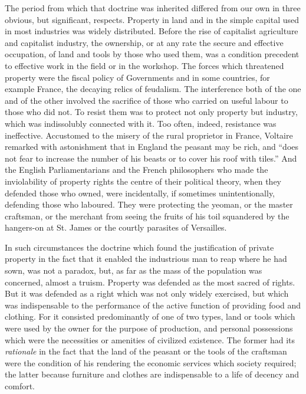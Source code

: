 \documentclass{book}
\begin{document}
The period from which that doctrine was inherited differed from our own in three obvious, but significant, respects. Property in land and in the simple capital used in most industries was widely distributed. Before the rise of capitalist agriculture and capitalist industry, the ownership, or at any rate the secure and effective occupation, of land and tools by those who used them, was a condition precedent to effective work in the field or in the workshop. The forces which threatened property were the fiscal policy of Governments and in some countries, for example France, the decaying relics of feudalism. The interference both of the one and of the other involved the sacrifice of those who carried on useful labour to those who did not. To resist them was to protect not only property but industry, which was indissolubly connected with it. Too often, indeed, resistance was ineffective. Accustomed to the misery of the rural proprietor in France, Voltaire remarked with astonishment that in England the peasant may be rich, and “does not fear to increase the number of his beasts or to cover his roof with tiles.” And the English Parliamentarians and the French philosophers who made the inviolability of property rights the centre of their political theory, when they defended those who owned, were incidentally, if sometimes unintentionally, defending those who laboured. They were protecting the yeoman, or the master craftsman, or the merchant from seeing the fruits of his toil squandered by the hangers-on at St. James or the courtly parasites of Versailles.

In such circumstances the doctrine which found the justification of private property in the fact that it enabled the industrious man to reap where he had sown, was not a paradox, but, as far as the mass of the population was concerned, almost a truism. Property was defended as the most sacred of rights. But it was defended as a right which was not only widely exercised, but which was indispensable to the performance of the active function of providing food and clothing. For it consisted predominantly of one of two types, land or tools which were used by the owner for the purpose of production, and personal possessions which were the necessities or amenities of civilized existence. The former had its \emph{rationale} in the fact that the land of the peasant or the tools of the craftsman were the condition of his rendering the economic services which society required; the latter because furniture and clothes are indispensable to a life of decency and comfort.
\end{document}
